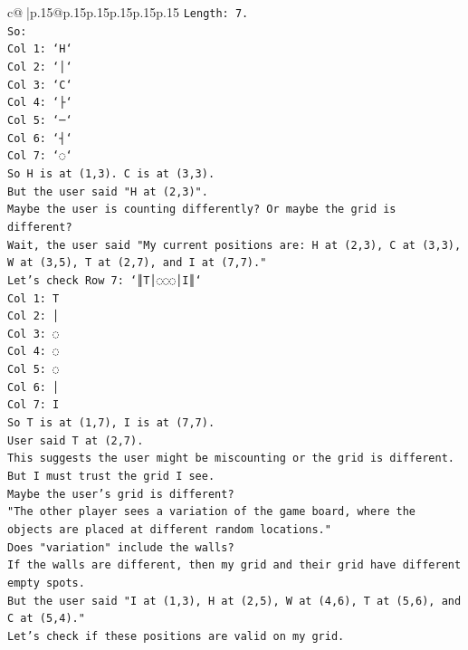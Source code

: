 \documentclass{article}
\begin{document}
{\begin{supertabular}{c@{$\;$}|p{.15\linewidth}@{}p{.15\linewidth}p{.15\linewidth}p{.15\linewidth}p{.15\linewidth}p{.15\linewidth}}
{{{\texttt{Length: 7.} \\
\texttt{So:} \\
\texttt{Col 1: `H`} \\
\texttt{Col 2: `│`} \\
\texttt{Col 3: `C`} \\
\texttt{Col 4: `├`} \\
\texttt{Col 5: `─`} \\
\texttt{Col 6: `┤`} \\
\texttt{Col 7: `◌`} \\
\texttt{So H is at (1,3). C is at (3,3).} \\
\texttt{But the user said "H at (2,3)".} \\
\texttt{Maybe the user is counting differently? Or maybe the grid is different?} \\
\texttt{Wait, the user said "My current positions are: H at (2,3), C at (3,3), W at (3,5), T at (2,7), and I at (7,7)."} \\
\texttt{Let's check Row 7: `║T│◌◌◌│I║`} \\
\texttt{Col 1: T} \\
\texttt{Col 2: │} \\
\texttt{Col 3: ◌} \\
\texttt{Col 4: ◌} \\
\texttt{Col 5: ◌} \\
\texttt{Col 6: │} \\
\texttt{Col 7: I} \\
\texttt{So T is at (1,7), I is at (7,7).} \\
\texttt{User said T at (2,7).} \\
\texttt{This suggests the user might be miscounting or the grid is different.} \\
\texttt{But I must trust the grid I see.} \\
\texttt{Maybe the user's grid is different?} \\
\texttt{"The other player sees a variation of the game board, where the objects are placed at different random locations."} \\
\texttt{Does "variation" include the walls?} \\
\texttt{If the walls are different, then my grid and their grid have different empty spots.} \\
\texttt{But the user said "I at (1,3), H at (2,5), W at (4,6), T at (5,6), and C at (5,4)."} \\
\texttt{Let's check if these positions are valid on my grid.} \\
}}}
\end{supertabular}}
\end{document}
